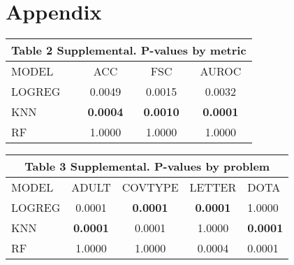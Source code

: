 \documentclass[twoside,11pt]{article}
\begin{document}


\appendix
\section*{Appendix}


\begin{table}[htb]
\vspace{2em}
\centering
\begin{tabular}{lccc}
\multicolumn{4}{c}{Table 2 Supplemental. P-values by metric}                \\ \hline
\multicolumn{1}{|l|}{MODEL}  & ACC             & FSC             & \multicolumn{1}{c|}{AUROC}           \\ \hline
\multicolumn{1}{|l|}{LOGREG} & 0.0049          & 0.0015          & \multicolumn{1}{c|}{0.0032}          \\
\multicolumn{1}{|l|}{KNN}    & \textbf{0.0004} & \textbf{0.0010} & \multicolumn{1}{c|}{\textbf{0.0001}} \\
\multicolumn{1}{|l|}{RF}     & 1.0000          & 1.0000          & \multicolumn{1}{c|}{1.0000}          \\ \hline
\end{tabular}
\end{table}


\begin{table}[htb]
\vspace{2em}
\centering
\begin{tabular}{lcccl}
\multicolumn{5}{c}{Table 3 Supplemental. P-values by problem}                                  \\ \hline
\multicolumn{1}{|l|}{MODEL}  & ADULT           & COVTYPE         & LETTER          & \multicolumn{1}{l|}{DOTA}            \\ \hline
\multicolumn{1}{|l|}{LOGREG} & 0.0001          & \textbf{0.0001} & \textbf{0.0001} & \multicolumn{1}{l|}{1.0000}          \\
\multicolumn{1}{|l|}{KNN}    & \textbf{0.0001} & 0.0001          & 1.0000          & \multicolumn{1}{l|}{\textbf{0.0001}} \\
\multicolumn{1}{|l|}{RF}     & 1.0000          & 1.0000          & 0.0004          & \multicolumn{1}{l|}{0.0001}          \\ \hline
\end{tabular}
\end{table}
\end{document}
